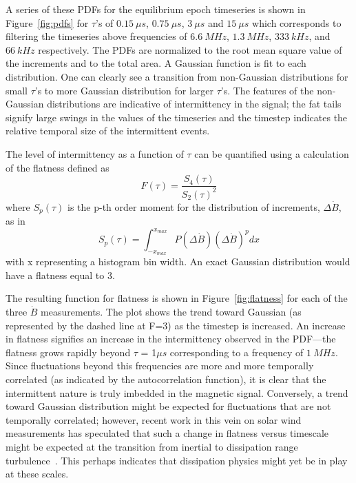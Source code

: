 \documentclass[12pt]{iopart}
\begin{document}
A series of these PDFs for the equilibrium epoch timeseries is shown in Figure~\ref{fig:pdfs} for $\tau$'s of $0.15~\mu s$, $0.75~\mu s$, $3~\mu s$ and $15~\mu s$ which corresponds to filtering the timeseries above frequencies of $6.6~MHz$, $1.3~MHz$, $333~kHz$, and $66~kHz$ respectively. The PDFs are normalized to the root mean square value of the increments and to the total area. A Gaussian function is fit to each distribution. One can clearly see a transition from non-Gaussian distributions for small $\tau$'s to more Gaussian distribution for larger $\tau$'s. The features of the non-Gaussian distributions are indicative of intermittency in the signal; the fat tails signify large swings in the values of the timeseries and the timestep indicates the relative temporal size of the intermittent events.

The level of intermittency as a function of $\tau$ can be quantified using a calculation of the flatness defined as~\cite{deWit13}
\begin{equation}
F(\tau) = \frac{S_{4}(\tau)}{S_{2}(\tau)^{2}}
\label{eq:flatness}
\end{equation}
where $S_{p}(\tau)$ is the p-th order moment for the distribution of increments, $\Delta \dot{B}$, as in
\begin{equation}
S_{p}(\tau) = \int_{-x_{max}}^{x_{max}} P(\Delta \dot{B})(\Delta \dot{B})^{p} dx
\label{eq:structurefunc}
\end{equation}
with x representing a histogram bin width. An exact Gaussian distribution would have a flatness equal to 3.

The resulting function for flatness is shown in Figure~\ref{fig:flatness} for each of the three $\dot{B}$ measurements. The plot shows the trend toward Gaussian (as represented by the dashed line at F=3) as the timestep is increased. An increase in flatness signifies an increase in the intermittency observed in the PDF---the flatness grows rapidly beyond $\tau$ = 1$\mu s$ corresponding to a frequency of $1~MHz$. Since fluctuations beyond this frequencies are more and more temporally correlated (as indicated by the autocorrelation function), it is clear that the intermittent nature is truly imbedded in the magnetic signal. Conversely, a trend toward Gaussian distribution might be expected for fluctuations that are not temporally correlated; however, recent work in this vein on solar wind measurements has speculated that such a change in flatness versus timescale might be expected at the transition from inertial to dissipation range turbulence~\cite{wan12_apj}. This perhaps indicates that dissipation physics might yet be in play at these scales.
\end{document}
